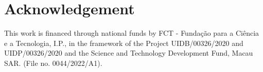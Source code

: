 \documentclass[a4paper,fleqn]{cas-dc}
\begin{document}
\section*{Acknowledgement}
This work is financed through national funds by FCT - Fundação para a Ciência e a Tecnologia, I.P., in the framework of the Project UIDB/00326/2020 and UIDP/00326/2020 and the Science and Technology Development Fund, Macau SAR. (File no. 0044/2022/A1).

%
\balance
%


\pagebreak
\begin{appendices}

\renewcommand{\thesection}{Appendix \Alph{section}}
\renewcommand{\thefigure}{A\arabic{figure}}
\setcounter{figure}{0}
\renewcommand{\thetable}{B\arabic{table}}
\setcounter{table}{0}


\end{appendices}
\end{document}
